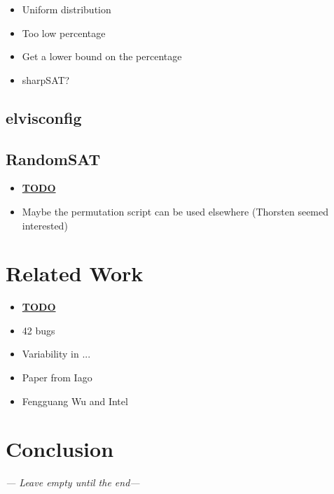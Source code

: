\documentclass[a4paper,11pt]{report}
\begin{document}
\begin{itemize}
    \item Uniform distribution
    \item Too low percentage
    \item Get a lower bound on the percentage
    \item sharpSAT?
\end{itemize}

\section{elvisconfig}


\section{RandomSAT}


\begin{itemize}
    \item \underline{\textbf{TODO}}
    \item Maybe the permutation script can be used elsewhere (Thorsten seemed 
        interested)
\end{itemize}



\newpage
\chapter{Related Work}

\begin{itemize}
    \item \textbf{\underline{TODO}}
    \item 42 bugs
    \item Variability in ...
    \item Paper from Iago
    \item Fengguang Wu and Intel
\end{itemize}



\newpage
\chapter{Conclusion}
\emph{--- Leave empty until the end---}




\newpage


\end{document}
